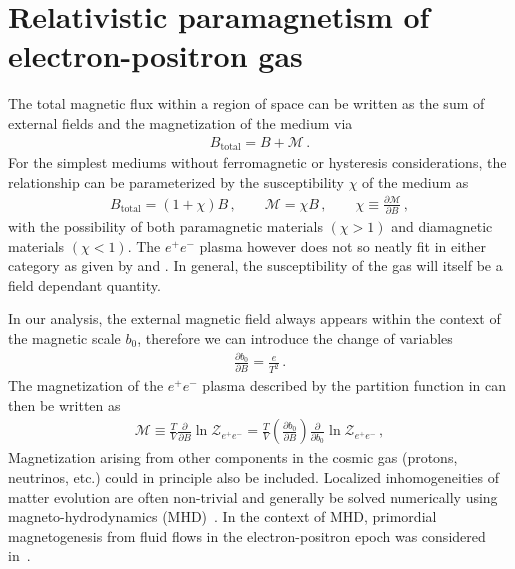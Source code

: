 \section{Relativistic paramagnetism of electron-positron gas}
\label{sec:magnetization}
\noindent The total magnetic flux within a region of space can be written as the sum of external fields and the magnetization of the medium via
\begin{align}
 \label{totalmag}
 {B}_\mathrm{total} = {B} + \mathcal{M}\,.
\end{align}
For the simplest mediums without ferromagnetic or hysteresis considerations, the relationship can be parameterized by the susceptibility $\chi$ of the medium as
\begin{align}
 \label{susceptibility}
 {B}_\mathrm{total} = (1+\chi){B}\,,\qquad \mathcal{M} = \chi{B}\,,\qquad \chi\equiv\frac{\partial\mathcal{M}}{\partial{B}}\,,
\end{align}
with the possibility of both paramagnetic materials $(\chi>1)$ and diamagnetic materials $(\chi<1)$. The $e^{+}e^{-}$ plasma however does not so neatly fit in either category as given by  and . In general, the susceptibility of the gas will itself be a field dependant quantity.

In our analysis, the external magnetic field always appears within the context of the magnetic scale $b_{0}$, therefore we can introduce the change of variables
\begin{align}
 \frac{\partial b_{0}}{\partial{B}}=\frac{e}{T^{2}}\,.
\end{align}
The magnetization of the $e^{+}e^{-}$ plasma described by the partition function in  can then be written as
\begin{align}
 \label{defmagetization}
 \mathcal{M}\equiv\frac{T}{V}\frac{\partial}{\partial{B}}\ln{\mathcal{Z}_{e^{+}e^{-}}} = \frac{T}{V}\left(\frac{\partial b_{0}}{\partial{B}}\right)\frac{\partial}{\partial b_{0}}\ln{\mathcal{Z}_{e^{+}e^{-}}}\,,
\end{align}
Magnetization arising from other components in the cosmic gas (protons, neutrinos, etc.) could in principle also be included. Localized inhomogeneities of matter evolution are often non-trivial and generally be solved numerically using magneto-hydrodynamics (MHD)~\citep{melrose2008quantum,Vazza:2017qge,Vachaspati:2020blt}. In the context of MHD, primordial magnetogenesis from fluid flows in the electron-positron epoch was considered in~\cite{Gopal:2004ut,Perrone:2021srr}.

